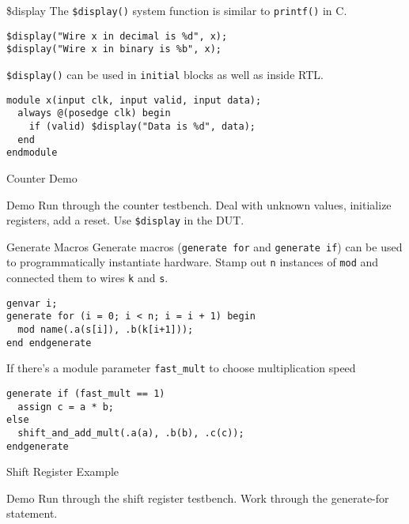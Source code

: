 \documentclass[12pt,aspectratio=169]{beamer}
\begin{document}
\begin{frame}[fragile]{\$display}
  The \verb|$display()| system function is similar to \verb|printf()| in C.
    \begin{verbatim}
$display("Wire x in decimal is %d", x);
$display("Wire x in binary is %b", x);
    \end{verbatim}

  \verb|$display()| can be used in \verb|initial| blocks as well as inside RTL.
  \begin{verbatim}
module x(input clk, input valid, input data);
  always @(posedge clk) begin
    if (valid) $display("Data is %d", data);
  end
endmodule
  \end{verbatim}
\end{frame}

\begin{frame}[fragile]{Counter Demo}
  \begin{block}{Demo}
    Run through the counter testbench. Deal with unknown values, initialize registers, add a reset. Use \verb|$display| in the DUT.
  \end{block}
\end{frame}

\begin{frame}[fragile]{Generate Macros}
  Generate macros (\verb|generate for| and \verb|generate if|) can be used to programmatically instantiate hardware.
  Stamp out \verb|n| instances of \verb|mod| and connected them to wires \verb|k| and \verb|s|.
  \begin{verbatim}
genvar i;
generate for (i = 0; i < n; i = i + 1) begin
  mod name(.a(s[i]), .b(k[i+1]));
end endgenerate
  \end{verbatim}

  If there's a module parameter \verb|fast_mult| to choose multiplication speed
  \begin{verbatim}
generate if (fast_mult == 1)
  assign c = a * b;
else
  shift_and_add_mult(.a(a), .b(b), .c(c));
endgenerate
  \end{verbatim}
\end{frame}

\begin{frame}[fragile]{Shift Register Example}
  \begin{block}{Demo}
    Run through the shift register testbench. Work through the generate-for statement.
  \end{block}
\end{frame}
\end{document}

